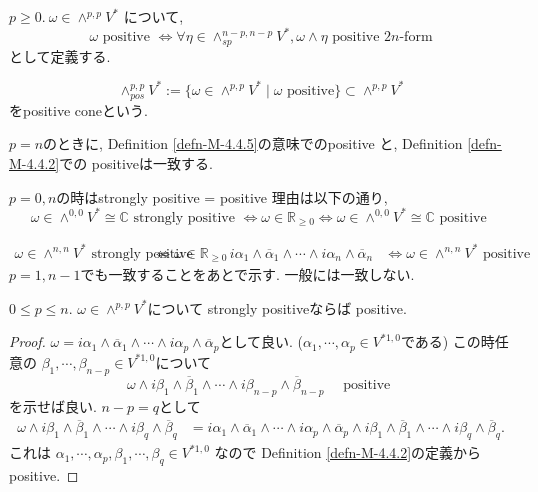 \begin{tcolorbox}[mybox]
\begin{defn}
\label{defn-M-4.4.5}
 \(p\ge 0.\ \omega\in \wedge^{p,p}V^*\) について, 
 \[\omega \text{ positive }\Longleftrightarrow\forall \eta\in \wedge_{sp}^{n-p,n-p}V^*,\omega\wedge\eta \text{ positive } 2n\text{-form}\]
 として定義する. 
 
$$
\wedge_{pos}^{p,p}V^{*}:= \{ \omega \in \wedge^{p,p}V^{*} \mid \text{$\omega$ positive}\}\subset 
\wedge^{p,p}V^{*}
$$
をpositive coneという.
\end{defn}
\end{tcolorbox}
 $p=n$のときに, Definition \ref{defn-M-4.4.5}の意味でのpositive と, 
Definition \ref{defn-M-4.4.2}での positiveは一致する.
 
 \begin{rem}
 $p=0, n$の時はstrongly positive = positive 
 理由は以下の通り, 
\[
\omega\in \wedge^{0,0}V^* \cong \mathbb{C}
\text{ strongly positive }
\Longleftrightarrow
\omega\in \mathbb{R}_{\ge 0}
\Longleftrightarrow
\omega\in \wedge^{0,0}V^* \cong \mathbb{C}
\text{  positive }
\]

\begin{align*}
\omega\in \wedge^{n,n}V^*
\text{ strongly positive}
&\Longleftrightarrow
\omega\in \mathbb{R}_{\ge 0}\,
i\alpha_1\wedge\overline{\alpha}_1\wedge\cdots\wedge i\alpha_n\wedge\overline{\alpha}_n
&\Longleftrightarrow
\omega\in \wedge^{n,n}V^* \text{  positive }
\end{align*}
 $p=1, n-1$でも一致することをあとで示す. 一般には一致しない. 
 \end{rem}




\begin{tcolorbox}[mybox]
\begin{lem}
\label{lem-M-4.4.6}
 \(0\le p\le n\). \(\omega\in \wedge^{p,p}V^*\)について
strongly positiveならば positive.
\end{lem}
\end{tcolorbox}
\begin{proof}

\(\omega=i\alpha_1\wedge \overline{\alpha}_1\wedge \cdots \wedge i\alpha_p\wedge \overline{\alpha}_p\)として良い. ($\alpha_1,\cdots,\alpha_p\in V^{*1,0}$である)
この時任意の \(\beta_1,\cdots,\beta_{n-p}\in V^{*1,0}\)について
 \[
 \omega\wedge i\beta_1\wedge \overline{\beta}_1\wedge \cdots \wedge i\beta_{n-p}\wedge \overline{\beta}_{n-p} \quad \text{  positive }
\]
を示せば良い. 
\(n-p=q\)として
\begin{align*}
\omega\wedge i\beta_1\wedge \overline{\beta}_1\wedge \cdots \wedge i\beta_q\wedge \overline{\beta}_q
&= i\alpha_1\wedge \overline{\alpha}_1\wedge \cdots \wedge i\alpha_p\wedge \overline{\alpha}_p
\wedge i\beta_1\wedge \overline{\beta}_1\wedge \cdots \wedge i\beta_q\wedge \overline{\beta}_q.
\end{align*}
これは \(\alpha_1,\cdots,\alpha_p,\beta_1,\cdots,\beta_q\in V^{*1,0}\) なので Definition \ref{defn-M-4.4.2}の定義からpositive.
\end{proof}


